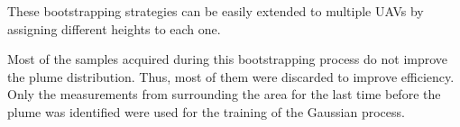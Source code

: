 These bootstrapping strategies can be easily extended to multiple UAVs by 
assigning different heights to each one.

Most of the samples acquired during this bootstrapping process do not improve 
the plume distribution. Thus, most of them were discarded to improve efficiency.  
Only the measurements from surrounding the area for the last time before the 
plume was identified were used for the training of the Gaussian process.

